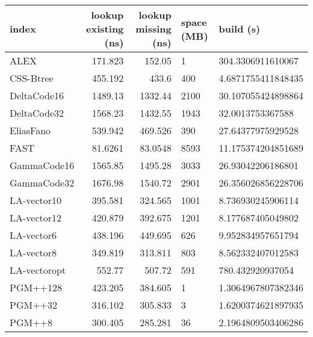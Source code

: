 \begin{tabular}{lrrll}
\hline
 index             &   lookup existing (ns) &   lookup missing (ns) & space (MB)   & build (s)             \\
\hline
 ALEX              &               171.823  &              152.05   & 1            & 304.3306911610067     \\
 CSS-Btree         &               455.192  &              433.6    & 400          & 4.6871755411848435    \\
 DeltaCode16       &              1489.13   &             1332.44   & 2100         & 30.107055424898864    \\
 DeltaCode32       &              1568.23   &             1432.55   & 1943         & 32.0013753367588      \\
 EliasFano         &               539.942  &              469.526  & 390          & 27.64377975929528     \\
 FAST              &                81.6261 &               83.0548 & 8593         & 11.175374204851689    \\
 GammaCode16       &              1565.85   &             1495.28   & 3033         & 26.93042206186801     \\
 GammaCode32       &              1676.98   &             1540.72   & 2901         & 26.356026856228706    \\
 LA-vector10       &               395.581  &              324.565  & 1001         & 8.736930245906114     \\
 LA-vector12       &               420.879  &              392.675  & 1201         & 8.177687405049802     \\
 LA-vector6        &               438.196  &              449.695  & 626          & 9.952834957651794     \\
 LA-vector8        &               349.819  &              313.811  & 803          & 8.562332407012583     \\
 LA-vectoropt      &               552.77   &              507.72   & 591          & 780.432920937054      \\
 PGM++128          &               423.205  &              384.605  & 1            & 1.3064967807382346    \\
 PGM++32           &               316.102  &              305.833  & 3            & 1.6200374621897935    \\
 PGM++8            &               300.405  &              285.281  & 36           & 2.1964809503406286    \\

\end{tabular}
